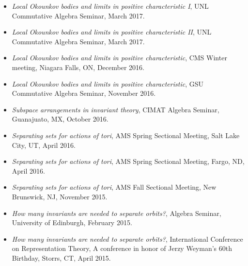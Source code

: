 \documentclass[12pt]{amsart}
\begin{document}
\begin{itemize}[leftmargin=9mm]
	\item \emph{Local Okounkov bodies and limits in positive characteristic I}, UNL Commutative Algebra Seminar, March 2017.
	
	\item \emph{Local Okounkov bodies and limits in positive characteristic II}, UNL Commutative Algebra Seminar, March 2017.

	\item \emph{Local Okounkov bodies and limits in positive characteristic}, CMS Winter meeting, Niagara Falls, ON, December 2016.

	\item \emph{Local Okounkov bodies and limits in positive characteristic}, GSU Commutative Algebra Seminar, November 2016.

	\item \emph{Subspace arrangements in invariant theory}, CIMAT Algebra Seminar, Guanajuato, MX, October 2016.


	
	\item \emph{Separating sets for actions of tori}, AMS Spring Sectional Meeting, Salt Lake City, UT, April 2016.
	\item \emph{Separating sets for actions of tori}, AMS Spring Sectional Meeting, Fargo, ND, April 2016.

	\item \emph{Separating sets for actions of tori}, AMS Fall Sectional Meeting, New Brunswick, NJ, November 2015.


	\item \emph{How many invariants are needed to separate
		orbits?}, Algebra Seminar, University of Edinburgh, February 2015.
	\item \emph{How many invariants are needed to separate
		orbits?}, International Conference on Representation Theory, A conference in honor of Jerzy Weyman's 60th Birthday, Storrs, CT, April 2015.
	


\end{itemize}
\end{document}
